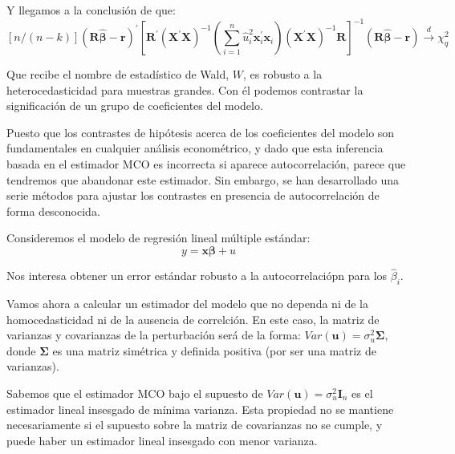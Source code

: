 Y llegamos a la conclusi\'on de que:
\[[n/(n-k)](\boldsymbol{R}\hat{\boldsymbol{\beta}}-\boldsymbol{r})^{\prime}\left[\boldsymbol{R}^{\prime}\left(\boldsymbol{X}^{\prime}\boldsymbol{X}\right)^{-1}\left(\sum_{i=1}^n\hat{u}_i^2\boldsymbol{x}_i^{\prime}\boldsymbol{x}_i\right)\left(\boldsymbol{X}^{\prime}\boldsymbol{X}\right)^{-1}\boldsymbol{R}\right]^{-1} (\boldsymbol{R}\hat{\boldsymbol{\beta}}-\boldsymbol{r})\overset{d}{\to}\chi^2_q \]

Que recibe el nombre de estad\'istico de Wald, $W$, es robusto a la heterocedasticidad para muestras grandes. Con \'el podemos contrastar la significaci\'on de un grupo de coeficientes del modelo.



Puesto que los contrastes de hip\'otesis acerca de los coeficientes del modelo son fundamentales en cualquier an\'alisis econom\'etrico, y dado que esta inferencia basada en el estimador MCO es incorrecta si aparece autocorrelaci\'on, parece que tendremos que abandonar este estimador. Sin embargo, se han desarrollado una serie m\'etodos para ajustar los contrastes en presencia de autocorrelaci\'on de forma desconocida.

Consideremos el modelo de regresi\'on lineal m\'ultiple est\'andar:
\[y=\boldsymbol{x}\boldsymbol{\beta}+u\]

Nos interesa obtener un error est\'andar robusto a la autocorrelaci\'opn para los $\hat{\beta}_i$. 




Vamos ahora a calcular un estimador del modelo que no dependa ni de la homocedasticidad ni de la ausencia de correlci\'on. En este caso, la matriz de varianzas y covarianzas de la perturbaci\'on ser\'a de la forma: $Var(\boldsymbol{u})=\sigma_u^2\boldsymbol{\Sigma}$, donde $\boldsymbol{\Sigma}$ es una matriz sim\'etrica y definida positiva (por ser una matriz de varianzas).

Sabemos que el estimador MCO bajo el supuesto de $Var\left(\boldsymbol{u}\right)=\sigma_{u}^{2}\boldsymbol{I}_{n}$
es el estimador lineal insesgado de m\'inima varianza. Esta propiedad
no se mantiene necesariamente si el supuesto sobre la matriz de covarianzas
no se cumple, y puede haber un estimador lineal insesgado con menor
varianza.

